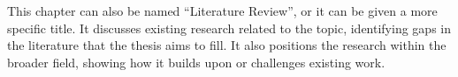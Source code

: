 This chapter can also be named ``Literature Review'',
or it can be given a more specific title.
It discusses existing research related to the topic,
identifying gaps in the literature that the thesis aims to fill.
It also positions the research within the broader field,
showing how it builds upon or challenges existing work.
